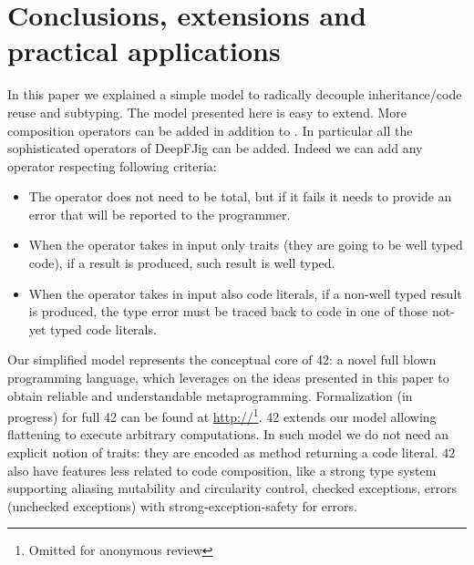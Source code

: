\section{Conclusions, extensions and practical applications}

In this paper we explained a simple model to 
radically decouple inheritance/code reuse and subtyping.
The model presented here is easy to extend.
More composition operators can be added in addition to \use.
In particular all the sophisticated operators of DeepFJig can be added.
 Indeed we can add any operator respecting following criteria:

\begin{itemize}
\item The operator does not need to be total, but if it fails it needs to provide an error that will be reported to the programmer.
\item When the operator takes in input only traits (they are going to be well typed code), if a result is produced,
 such result is well typed.
\item When the operator takes in input also code literals, if a non-well typed result is produced,
the type error must be traced back to code in one of those not-yet typed code literals.
 \end{itemize}
 

 
 Our simplified model represents the conceptual core of  42: a novel full blown programming language,
which leverages on the ideas presented in this paper to obtain reliable and understandable metaprogramming.
Formalization (in progress) for full 42 can be found at
\url{http://}\footnote{Omitted for anonymous review}. 
42 extends our model allowing
flattening to execute arbitrary computations.
In such model we do not need an explicit notion of traits: they are encoded as method returning a code literal.
42 also have features less related to code composition, like
  a strong type system supporting aliasing mutability and circularity control,
   checked exceptions, errors (unchecked exceptions) with strong-exception-safety for errors.

\begin{comment}
42 do not have a finite set of composition operators; they can be
added using the built in support for native method calls. They can
be dynamically checked to verify that they are well behaved
according to our predicate, or they can be trusted to achieve
efficiency.
\end{comment}

